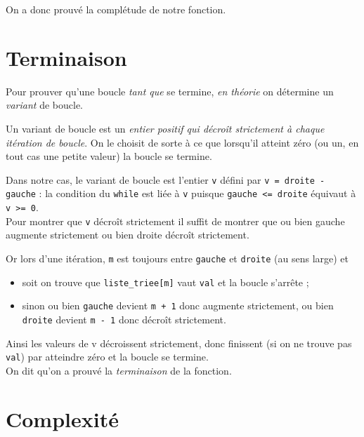 On a donc prouvé la complétude de notre fonction.

\section{Terminaison}

Pour prouver qu'une boucle \textit{tant que} se termine, \textit{en théorie} on détermine un \textit{variant} de boucle.

\begin{definition}[]
	Un variant de boucle est un \textit{entier positif qui décroît strictement à chaque itération de boucle}. On le choisit de sorte à ce que lorsqu'il atteint zéro (ou un, en tout cas une petite valeur) la boucle se termine.\\
\end{definition}

Dans notre cas, le variant de boucle est l'entier \texttt{v} défini par \texttt{v = droite - gauche} : la condition du \texttt{while} est liée à \texttt{v} puisque \texttt{gauche <= droite} équivaut à \texttt{v >= 0}.\\

Pour montrer que \texttt{v} décroît strictement il suffit de montrer que ou bien gauche augmente strictement ou bien droite décroît	strictement.

Or lors d'une itération, \texttt{m} est toujours entre \texttt{gauche} et \texttt{droite} (au sens large) et
\begin{itemize}
	\item soit on trouve que \texttt{liste_triee[m]} vaut \texttt{val} et la boucle s'arrête ;
	\item sinon ou bien \texttt{gauche} devient \texttt{m + 1} donc augmente strictement, ou bien \texttt{droite} devient \texttt{m - 1} donc décroît strictement.
\end{itemize}

Ainsi les valeurs de v décroissent strictement, donc finissent (si on ne trouve pas \texttt{val}) par atteindre zéro et la boucle se termine.\\
On dit qu'on a prouvé la \textit{terminaison} de la fonction.



\section{Complexité}

